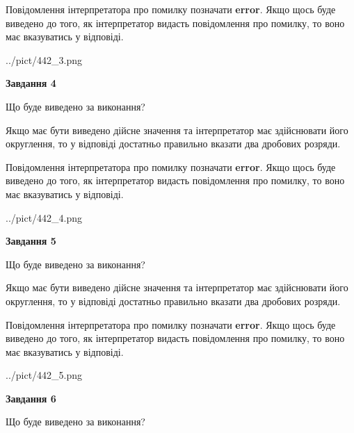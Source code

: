 \documentclass[12pt, ukrainian]{article}
\begin{document}
{\begin {Large}
Повідомлення інтерпретатора про помилку позначати \textbf{error}.
Якщо щось буде виведено до того, як інтерпретатор видасть повідомлення про помилку, 
то воно має вказуватись у відповіді. \par

\begin{center}
	{../pict/442_3.png}
\end{center}
\newpage

{\begin {center}\textbf{Завдання 4}\end {center}}\par
Що буде виведено за виконання? \par

Якщо має бути виведено дійсне значення та інтерпретатор має здійснювати його округлення, 
то у відповіді достатньо правильно вказати два дробових розряди.

Повідомлення інтерпретатора про помилку позначати \textbf{error}.
Якщо щось буде виведено до того, як інтерпретатор видасть повідомлення про помилку, 
то воно має вказуватись у відповіді. \par

\begin{center}
	{../pict/442_4.png}
\end{center}
\newpage

{\begin {center}\textbf{Завдання 5}\end {center}}\par
Що буде виведено за виконання? \par

Якщо має бути виведено дійсне значення та інтерпретатор має здійснювати його округлення, 
то у відповіді достатньо правильно вказати два дробових розряди.

Повідомлення інтерпретатора про помилку позначати \textbf{error}.
Якщо щось буде виведено до того, як інтерпретатор видасть повідомлення про помилку, 
то воно має вказуватись у відповіді. \par

\begin{center}
	{../pict/442_5.png}
\end{center}
\newpage

{\begin {center}\textbf{Завдання 6}\end {center}}\par
Що буде виведено за виконання? \par


\end{Large}}
\end{document}
